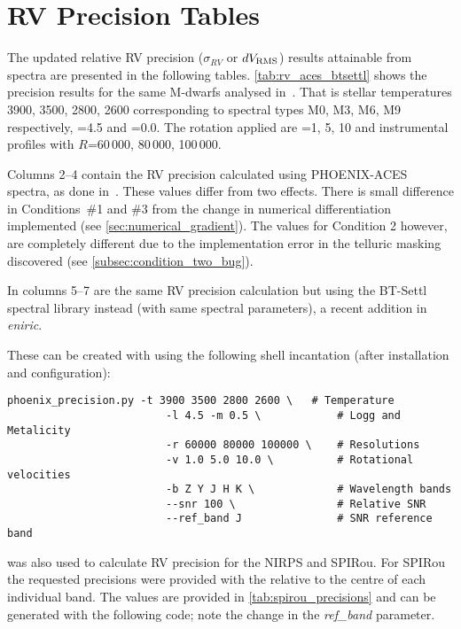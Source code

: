 
\chapter{{RV} Precision Tables} %

\label{app:nir_prec_amendment}

The updated relative {RV} precision ($\sigma_{RV}$ or $dV_{\textrm{RMS}}$) results attainable from \nir{} spectra are presented in the following tables.
\cref{tab:rv_aces_btsettl} shows the precision results for the same M-dwarfs analysed in~\citet{figueira_radial_2016}.
That is stellar temperatures 3900, 3500, 2800, 2600\K{} corresponding to spectral types M0, M3, M6, M9 respectively, \Logg{}=4.5 and \feh{}=0.0.
The rotation applied are \Vsini{}=1, 5, 10\kmps{} and instrumental profiles with \(R\)=60\,000, 80\,000, 100\,000.

Columns 2--4 contain the {RV} precision calculated using {PHOENIX-ACES} spectra, as done in~\citet{figueira_radial_2016}.
These values differ from two effects.
There is small difference in Conditions~\#1 and \#3 from the change in numerical differentiation implemented (see \cref{sec:numerical_gradient}).
The values for Condition 2 however, are completely different due to the implementation error in the telluric masking discovered (see \cref{subsec:condition_two_bug}).

In columns 5--7 are the same {RV} precision calculation but using the {BT-Settl} spectral library instead (with same spectral parameters), a recent addition in \emph{eniric}.

These can be created with \eniric{} using the following shell incantation (after installation and configuration):
\begin{lstlisting}[label={lst:commandline_incantation}]
    phoenix_precision.py -t 3900 3500 2800 2600 \   # Temperature
                         -l 4.5 -m 0.5 \            # Logg and Metalicity
                         -r 60000 80000 100000 \    # Resolutions
                         -v 1.0 5.0 10.0 \          # Rotational velocities
                         -b Z Y J H K \             # Wavelength bands
                         --snr 100 \                # Relative SNR
                         --ref_band J               # SNR reference band
\end{lstlisting}

\Eniric{} was also used to calculate {RV} precision for the {NIRPS} and {SPIRou}.
For {SPIRou} the requested precisions were provided with the \snr{} relative to the centre of each individual band.
The values are provided in \cref{tab:spirou_precisions} and can be generated with the following code; note the change in the \emph{ref\_band} parameter.


